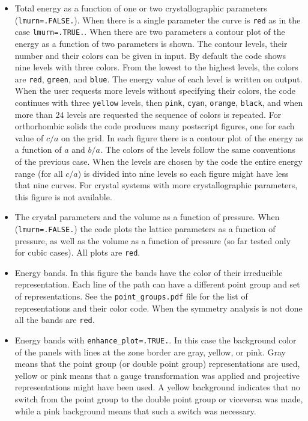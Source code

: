\documentclass[12pt,a4paper,twoside]{report}
\begin{document}
\begin{itemize}
\item
Total energy as a function of one or two crystallographic parameters
(\texttt{lmurn=.FALSE.}). When there is a single parameter the curve is
\texttt{red} as in the case \texttt{lmurn=.TRUE.}. When there are two
parameters a contour plot of the energy as a function of two parameters
is shown. The contour levels, their number and their colors can be
given in input. By default the code shows nine levels with three
colors. From the lowest to the highest levels, the colors are \texttt{red},
\texttt{green}, and \texttt{blue}. The energy value of each level is 
written on output. When the user requests more levels without specifying
their colors, the code continues with three \texttt{yellow} levels, 
then \texttt{pink}, \texttt{cyan}, \texttt{orange}, \texttt{black}, and
when more than $24$ levels are requested the sequence of colors is repeated.
For orthorhombic solids the code produces many postscript figures, one
for each value of $c/a$ on the grid. In each figure there is a contour
plot of the energy as a function of $a$ and $b/a$. The colors of the levels
follow the same conventions of the previous case. When the levels are chosen
by the code the entire energy range (for all $c/a$) is divided into nine
levels so each figure might have less that nine curves.
For crystal systems with more crystallographic parameters, this figure is
not available.

\item
The crystal parameters and the volume as a function of pressure.
When (\texttt{lmurn=.FALSE.}) the code plots the lattice parameters 
as a function of pressure, as well as the volume as a function of 
pressure (so far tested only for cubic cases). All plots are \texttt{red}.

\item
Energy bands. In this figure the bands have the color of
their irreducible representation. Each line of the path can have a different
point group and set of representations. See the \texttt{point\_groups.pdf} file
for the list of representations and their color code. 
When the symmetry analysis is not done all the bands are \texttt{red}.

\item
Energy bands with \texttt{enhance\_plot=.TRUE.}. In this case 
the background color of the panels with lines at the zone border are 
gray, yellow, or pink. Gray means that the point group (or double point
group) representations are used, yellow or pink means that a gauge 
transformation was applied and projective representations might have been used. 
A yellow background indicates that no switch 
from the point group to the double point group or viceversa was made, 
while a pink background means that such a switch was necessary.
                              

\end{itemize}
\end{document}
